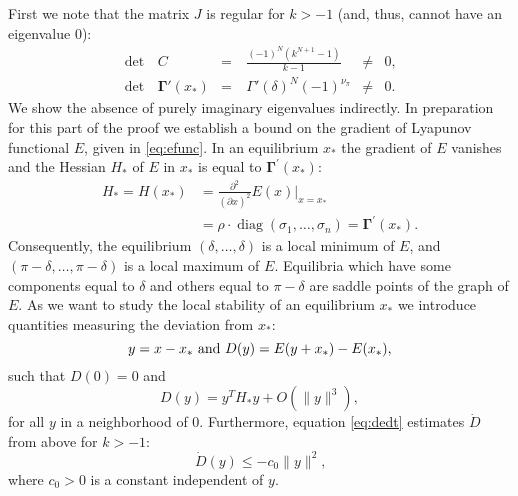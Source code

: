 \documentclass[aps,pre,twocolumn,a4paper,showkeys,showpacs]{revtex4}\usepackage{color}
\theoremstyle{plain}
\theoremstyle{plain}
\begin{document}
First we note that the matrix $J$ is regular for $k>-1$ (and, thus, cannot
have an eigenvalue $0$):
\begin{equation}
\begin{aligned} \det\,&C&=\ &\frac{\left(-1\right)^{N}\left(k^{N+1}-1\right)}{k-1} &\neq&0\mbox{,}\\ \det\,& \boldsymbol{\Gamma}'(x_{*})&=\ &\Gamma'(\delta)^{N}(-1)^{\nu_{\pi}} &\neq&0\mbox{.} \end{aligned}
\end{equation}
We show the absence of purely imaginary eigenvalues indirectly. In preparation
for this part of the proof we establish a bound on the gradient of Lyapunov
functional $E$, given in \eqref{eq:efunc}. In an equilibrium $x_{*}$ the
gradient of $E$ vanishes and the Hessian $H_{*}$ of $E$ in $x_{*}$ is equal to
$\boldsymbol{\Gamma}^{\prime}(x_{*})$:
\begin{equation}\begin{split}
H_{*}=H(x_{*}) & =\frac{\partial^{2}}{(\partial x)^{2}}E(x)\vert_{x=x_{*}}\\
& = \rho\cdot\operatorname{diag}(\sigma_{1},\dotsc,\sigma_{n}) =
\boldsymbol{\Gamma}^{\prime}(x_{*}).\label{eq:d2e}\end{split}
\end{equation}
Consequently, the equilibrium $(\delta,\dotsc,\delta)$ is a local minimum of
$E$, and $(\pi-\delta,\dotsc,\pi-\delta)$ is a local maximum of $E$.
Equilibria which have some components equal to $\delta$ and others equal to
$\pi-\delta$ are saddle points of the graph of $E$. As we want to study the
local stability of an equilibrium $x_{*}$ we introduce quantities measuring
the deviation from $x_{*}$:
\begin{equation}
y=x-x_{*}\mbox{\ and\
}D(y)=E(y+x_{*})-E(x_{*}),
\end{equation}
such that $D(0)=0$ and
\begin{equation}
D(y)=y^{T}H_{*}y+O(\|y\|^{3}),\label{eq:ebound}\end{equation}
for all $y$ in a neighborhood of $0$. Furthermore, equation \eqref{eq:dedt}
estimates $\dot{D}$ from above for $k>-1$:
\begin{equation}
\dot{D}(y)\leq-c_{0}\|y\|^{2}\mbox{,}\label{eq:dedtbound}\end{equation}
where $c_{0}>0$ is a constant independent of $y$.
\end{document}
